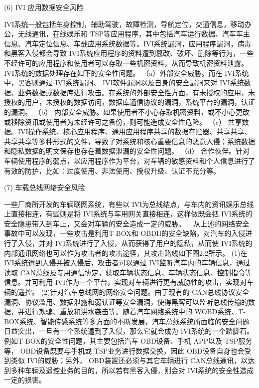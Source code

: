 (6) IVI 应用数据安全风险 

IVI系统一般包括车身控制，辅助驾驶，故障检测，导航定位，交通信息，移动办公，无线通讯，在线娱乐和 TSP等应用程序，其中包括汽车运行数据、汽车车主信息、汽车定位信息、车载应用系统数据等。IVI系统漏洞，应用程序漏洞，病毒和黑客入侵都会导致 IVI系统应用程序的资料遭到篡改、破坏、删除等行为，一些不经许可的应用程序和使用者可以存取一些机密资料，从而导致机密资料泄露。IVI系统的数据处理存在如下的安全性问题。
（a）外部安全威胁。而在 IVI系统中，黑客则通过 IVI系统漏洞、 IVI软件漏洞以及自身的安全漏洞来对 IVI系统数据、业务数据或数据库进行攻击。在系统的外部安全性方面，有未授权的应用，未授权的用户，未授权的数据访问，数据库通信协议的漏洞，系统平台的漏洞，认证的漏洞。 
（b） 内部安全威胁。如果使用者不小心存取机密资料，或不小心更改或移除资讯或使用者为未经许可之备份，则可能造成安全性危险。
（c） 共享数据。IVI操作系统、核心应用程序、通用应用程序共享的数据存贮器、共享共享、共享共享等多种形式的文件，导致了对系统和核心重要信息的恶意入侵；系统数据和隐私数据的明文保存也存在着数据泄漏的安全性问题。
（d） 合作伙伴。针对车辆使用程序的弱点，以应用程序作为平台，对车辆的敏感资料和个人信息进行了有效的防护，比如：过度使用、非法使用、授权升级、认证不充分等。 

(7) 车载总线网络安全风险 

一些厂商所开发的车辆联网系统，有些以 IVI为总线结点，与车内的资讯娱乐总线上直接相连，有些则是将 IVI系统与车用网关直接相连，这样做既会把 IVI系统的安全隐患带入到车上，又会对车辆的安全造成一定的威胁。
 
从上述的网络安全事故中可以发现，一些攻击是利用T-BOX和 OBDII的安全缺陷，对汽车的入侵进行了入侵，并对 IVI系统进行了入侵，从而获得了用户的隐私，从而使 IVI系统的内部通讯网络也可以作为攻击者的攻击途径，其攻击路线如下图2.2所示。
(1)在 IVI系统遭到入侵并被入侵后，攻击者可以通过 IVI监听汽车内的车辆信息，通过读取 CAN总线及专用通信协定，获取车辆状态信息、车辆状态信息、控制指令等信息。并可利用 IVI作为一个平台，实现对车辆进行更有威胁性的攻击，实现对车辆的遥控。
(2)针对汽车总线网的网络安全问题。由于现有的 CAN总线协议安全漏洞、协议滥用、数据泄露和弱认证等安全漏洞，使得黑客可以监听总线传输的数据，并进行欺骗、重放和洪水袭击等。随着汽车网络系统中的 WOBD系统、T-BOX系统、智能传感系统等多方面的不断发展，汽车总线系统所面临的安全问题日益突出，一旦有一个系统遭到了入侵，那么它就会成为 IVI系统的一个踏脚石。例如T-BOX的安全性问题，其主要包括汽车 OBD设备、手机 APP以及 TSP服务等， OBD设备既要与手机或 TSP业务进行数据交换，因此 OBD设备自身也会受到类似 IVI的威胁；另外， OBD装置还必须与其它车辆进行 CAN总线通讯，以达到多种车辆及遥控业务的目的，所以若有黑客入侵，则会对 IVI系统的安全性造成一定的损害。


